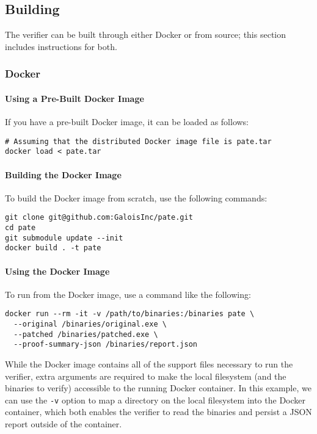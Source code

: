 \subsection{Building \TOOL{}}

The \TOOL{} verifier can be built through either Docker or from source; this section includes instructions for both. %

\subsubsection{Docker}

\paragraph{Using a Pre-Built Docker Image} %
If you have a pre-built Docker image, it can be loaded as follows:

\begin{lstlisting}
# Assuming that the distributed Docker image file is pate.tar
docker load < pate.tar
\end{lstlisting}

\paragraph{Building the Docker Image} %
To build the Docker image from scratch, use the following commands:

\begin{lstlisting}
git clone git@github.com:GaloisInc/pate.git
cd pate
git submodule update --init
docker build . -t pate
\end{lstlisting}

\paragraph{Using the Docker Image} %
To run \TOOL{} from the Docker image, use a command like the following:

\begin{lstlisting}
docker run --rm -it -v /path/to/binaries:/binaries pate \
  --original /binaries/original.exe \
  --patched /binaries/patched.exe \
  --proof-summary-json /binaries/report.json
\end{lstlisting}

While the Docker image contains all of the support files necessary to run the verifier, extra arguments are required to make the local filesystem (and the binaries to verify) accessible to the running Docker container. %
In this example, we can use the \lstinline{-v} option to map a directory on the local filesystem into the Docker container, which both enables the verifier to read the binaries and persist a JSON report outside of the container. %

